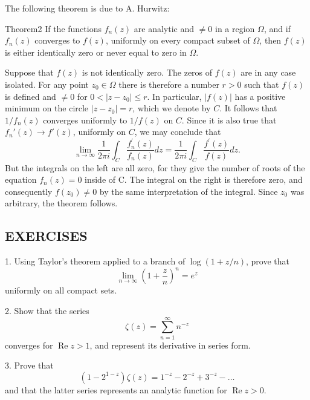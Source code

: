 The following theorem is due to A. Hurwitz:

\begin{originalstatement}{Theorem}{2}\label{thm:5.2}
If the functions $f_{n}(z)$ are analytic and $\neq0$ in a region $\Omega$, and if $f_{n}(z)$ converges to $f(z)$, uniformly on every compact subset of $\Omega$, then $f(z)$ is either identically zero or never equal to zero in $\Omega$.
\end{originalstatement}
Suppose that $f(z)$ is not identically zero. The zeros of $f(z)$ are in any case isolated. For any point $z_0 \in \Omega$ there is therefore a number $r > 0$ such that $f(z)$ is defined and $\neq 0$ for $0 < |z - z_0| \leq r$. In particular, $|f(z)|$ has a positive minimum on the circle $|z - z_0| = r$, which we denote by $C$. It follows that $1 / f_n(z)$ converges uniformly to $1 / f(z)$ on $C$. Since it is also true that $f_n'(z) \to f'(z)$, uniformly on $C$, we may conclude that
\begin{equation*}
\lim _ {n \rightarrow \infty} \frac {1}{2 \pi i} \int_ {C} \frac {f _ {n} ^ {\prime} (z)}{f _ {n} (z)} d z = \frac {1}{2 \pi i} \int_ {C} \frac {f ^ {\prime} (z)}{f (z)} d z.
\end{equation*}
But the integrals on the left are all zero, for they give the number of roots of the equation $f_{n}(z) = 0$ inside of C. The integral on the right is therefore zero, and consequently $f(z_{0}) \neq 0$ by the same interpretation of the integral. Since $z_{0}$ was arbitrary, the theorem follows.

\subsection*{EXERCISES}
1. Using Taylor's theorem applied to a branch of $\log(1+z/n)$, prove that
\begin{equation*}
\lim _ {n \rightarrow \infty} \left(1 + \frac {z}{n}\right) ^ {n} = e ^ {z}
\end{equation*}
uniformly on all compact sets.

2. Show that the series
\begin{equation*}
\zeta (z) = \sum_ {n = 1} ^ {\infty} n ^ {- z}
\end{equation*}
converges for $\operatorname{Re} z > 1$, and represent its derivative in series form.

3. Prove that
\begin{equation*}
(1 - 2 ^ {1 - z}) \zeta (z) = 1 ^ {- z} - 2 ^ {- z} + 3 ^ {- z} - \dots
\end{equation*}
and that the latter series represents an analytic function for $\operatorname{Re} z > 0$.



